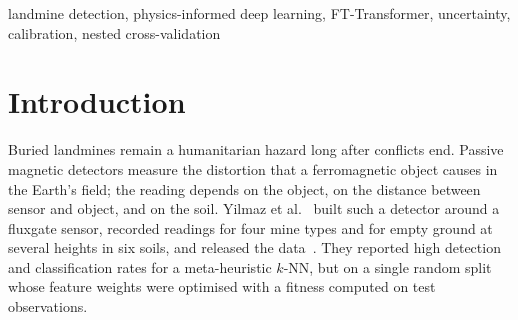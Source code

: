 \documentclass[conference]{IEEEtran}
\newcommand{\pift}{PI-FT-Transformer}
\begin{document}
\begin{abstract}
We classify readings of a passive magnetic-anomaly landmine detector into five classes (no mine and four mine types) from the sensor voltage, the sensor height and the soil type, using the public UCI \emph{Land Mines} dataset of \vRows{} readings. We propose a physics-informed FT-Transformer (\pift) whose inputs include features derived from the inverse-cube decay of a dipole field, trained with a physics-consistency loss, a cost-sensitive loss that penalises missed mines, and input-noise augmentation. Six neural variants and four classical baselines are compared under nested cross-validation (stratified 5-fold, 5 repetitions, Optuna tuning inside every training fold). The \pift{} reaches \vAccPiFt{} $\pm$ \vAccsdPiFt{} accuracy and \vDetPiFt\,\% mine/no-mine detection accuracy, statistically tied with a tuned RBF support vector machine (\vAccSvm{} $\pm$ \vAccsdSvm{}; corrected repeated-CV $t$-test $p$~\vPtPiFtVsSvmAccuracy) and significantly better than random forest, XGBoost and $k$-NN. Its advantages are in safety-relevant behaviour: when the half of the readings it is least sure about is referred to a human, its accuracy on the rest is \vSelPiFtMcFifty\,\% against \vSelSvmMpFifty\,\% for the SVM, and under strong sensor noise it misses fewer mines (\vNoisePiFtHalfMiss\,\% against \vNoiseSvmHalfMiss\,\%). A one-pass entropy flag marks \vUncPiFtSmFlaggedShare\,\% of readings as ``uncertain -- inspect manually'', leaving \vUncPiFtSmMineMissedUnflagged\,\% of mines missed without a flag. Physics-based features and loss give small, non-significant gains, and no model transfers to an unseen soil type (at most \vLosoMax\,\% accuracy). The INT8 ONNX model is \vEdgeKbIntEight{}~KB and classifies a reading in about \vLatOnnxIntEight~\textmu s on one laptop CPU thread.
\end{abstract}

\begin{IEEEkeywords}
landmine detection, physics-informed deep learning, FT-Transformer, uncertainty, calibration, nested cross-validation
\end{IEEEkeywords}

\section{Introduction}
Buried landmines remain a humanitarian hazard long after conflicts end. Passive magnetic detectors measure the distortion that a ferromagnetic object causes in the Earth's field; the reading depends on the object, on the distance between sensor and object, and on the soil. Yilmaz et al.~\cite{yilmaz2018} built such a detector around a fluxgate sensor, recorded readings for four mine types and for empty ground at several heights in six soils, and released the data~\cite{uci_landmines}. They reported high detection and classification rates for a meta-heuristic $k$-NN, but on a single random split whose feature weights were optimised with a fitness computed on test observations.
\end{document}
